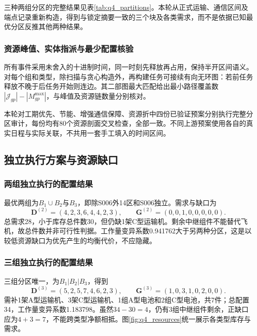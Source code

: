 三种两组分区的完整结果见表\ref{tab:q4_partitions}。本轮从正式运输、通信区间及端点记录重新构造，得到与锁定摘要一致的三个块及各类需求，而不是依据已知最优分区反推其他两种结果。


\subsubsection{资源峰值、实体指派与最少配置核验}
所有事件采用未舍入的十进制时间，同一时刻先释放再占用，保持半开区间语义。对每个组和类型，除扫描与贪心构造外，再构建任务可接续有向无环图：若前任务释放不晚于后任务开始则连边。其二部图最大匹配给出最小路径覆盖数$|\mathcal J_{gp}|-|M_{gp}^{\max}|$，与峰值及资源链数量分别核对。

本轮对工期优先、节能、增强通信保障、资源折中四份已验证预案分别执行完整分区审计，每份均有80个资源剖面交叉检查，全部一致。不同上游预案使用各自的真实日程与实际关联，不共用一套手工填入的时间区间。



\subsection{独立执行方案与资源缺口}
\subsubsection{两组独立执行的配置结果}
最优两组为$B_1\cup B_2$与$B_3$，即除S006外14区和S006独立。需求与缺口为
\begin{equation}
 \boldsymbol D^{(2)}=(4,2,3,6,4,4,2,3),\qquad
 \boldsymbol G^{(2)}=(0,0,1,0,0,0,0,0).
\label{eq:q4_two}
\end{equation}
总需求28，小于库存总件数30，但仍缺1架C型运输机。剩余中继组件不能替代飞机，故总件数并非可行性判据。工作量变异系数0.941762大于另两种分区，这是以较低资源缺口为优先产生的均衡代价，不应隐藏。

\subsubsection{三组独立执行的配置结果}
三组分区唯一，为$B_1|B_2|B_3$，得到
\begin{equation}
 \boldsymbol D^{(3)}=(5,2,5,7,4,6,2,3),\qquad
 \boldsymbol G^{(3)}=(1,0,3,1,0,2,0,0).
\label{eq:q4_three}
\end{equation}
需补1架A型运输机、3架C型运输机、1组A型电池和2组C型电池，共7件；总配置34，工作量变异系数1.183798。虽然$34-30=4$，仍有3组中继组件剩余，正缺口应为$4+3=7$，不能跨类型净额相抵。图\ref{fig:q4_resources}统一展示各类型库存与需求。


